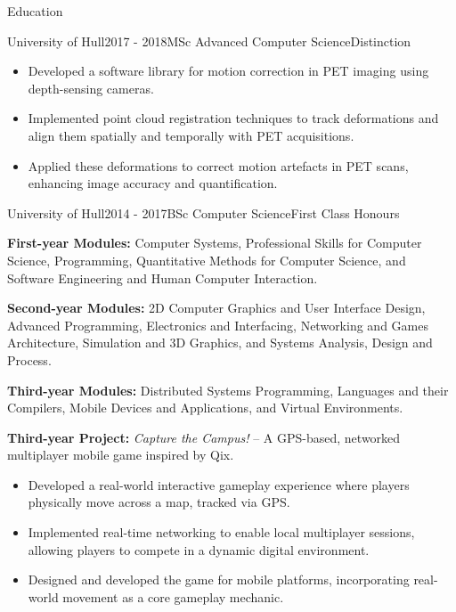 \documentclass{cv}
\begin{document}
\begin{rSection}{Education}
\begin{rSubsection}{University of Hull}{2017 - 2018}{MSc Advanced Computer Science}{Distinction}
            \item \begin{itemize}
                \item Developed a software library for motion correction in PET imaging using depth-sensing cameras.
                \item Implemented point cloud registration techniques to track deformations and align them spatially and temporally with PET acquisitions.
                \item Applied these deformations to correct motion artefacts in PET scans, enhancing image accuracy and quantification.
            \end{itemize}
        \end{rSubsection}
        
        \item \begin{rSubsection}{University of Hull}{2014 - 2017}{BSc Computer Science}{First Class Honours}
            \item \textbf{First-year Modules:} Computer Systems, Professional Skills for Computer Science, Programming, Quantitative Methods for Computer Science, and Software Engineering and Human Computer Interaction.

            \item \textbf{Second-year Modules:} 2D Computer Graphics and User Interface Design, Advanced Programming, Electronics and Interfacing, Networking and Games Architecture, Simulation and 3D Graphics, and Systems Analysis, Design and Process.

            \item \textbf{Third-year Modules:} Distributed Systems Programming, Languages and their Compilers, Mobile Devices and Applications, and Virtual Environments.
            
            \item \textbf{Third-year Project:} \textit{Capture the Campus!} – A GPS-based, networked multiplayer mobile game inspired by Qix.
            
            \item \begin{itemize}
                \item Developed a real-world interactive gameplay experience where players physically move across a map, tracked via GPS.
                \item Implemented real-time networking to enable local multiplayer sessions, allowing players to compete in a dynamic digital environment.
                \item Designed and developed the game for mobile platforms, incorporating real-world movement as a core gameplay mechanic.
            \end{itemize}
        \end{rSubsection}
    \end{rSection}
\end{document}
